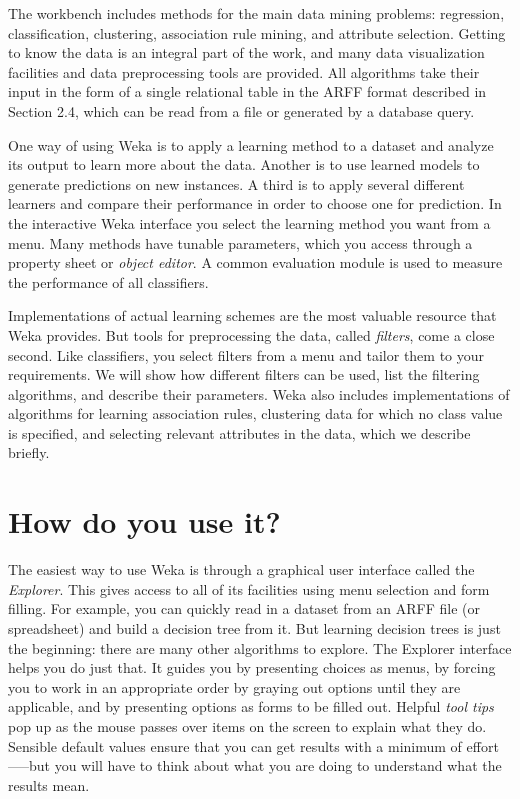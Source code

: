 The workbench includes methods for the main data mining problems:
regression, classification, clustering, association rule mining, and
attribute selection. Getting to know the data is an integral part of
the work, and many data visualization facilities and data
preprocessing tools are provided. All algorithms take their input in
the form of a single relational table in the ARFF format described in
Section 2.4, which can be read from a file or generated by a database
query.

One way of using Weka is to apply a learning method to a dataset and
analyze its output to learn more about the data. Another is to use
learned models to generate predictions on new instances. A third is to
apply several different learners and compare their performance in
order to choose one for prediction. In the interactive Weka interface
you select the learning method you want from a menu. Many methods have
tunable parameters, which you access through a property sheet or
\textit{object editor}. A common evaluation module is used to measure the
performance of all classifiers.
 
Implementations of actual learning schemes are the most valuable
resource that Weka provides. But tools for preprocessing the data,
called \textit{filters}, come a close second. Like classifiers, you select
filters from a menu and tailor them to your requirements. We will show
how different filters can be used, list the filtering algorithms, and
describe their parameters. Weka also includes implementations of
algorithms for learning association rules, clustering data for which
no class value is specified, and selecting relevant attributes in the
data, which we describe briefly.

\section{How do you use it?}

The easiest way to use Weka is through a graphical user interface
called the \textit{Explorer}. This gives access to all of its
facilities using menu selection and form filling. For example, you can
quickly read in a dataset from an ARFF file (or spreadsheet) and build
a decision tree from it. But learning decision trees is just the
beginning: there are many other algorithms to explore. The Explorer
interface helps you do just that. It guides you by presenting choices
as menus, by forcing you to work in an appropriate order by graying
out options until they are applicable, and by presenting options as
forms to be filled out. Helpful \textit{tool tips} pop up as the mouse
passes over items on the screen to explain what they do. Sensible
default values ensure that you can get results with a minimum of
effort—--but you will have to think about what you are doing to
understand what the results mean.

